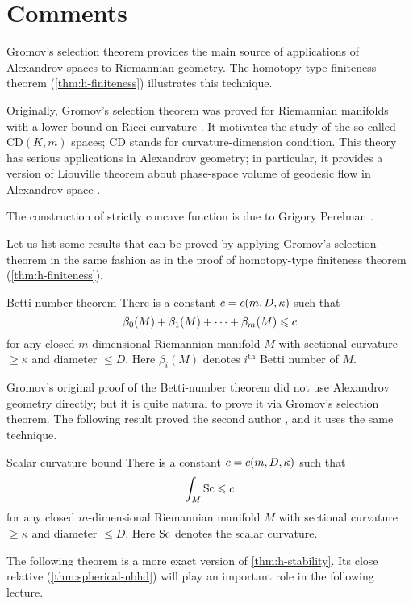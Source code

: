 \section{Comments}

Gromov's selection theorem provides the main source of applications of Alexandrov spaces to Riemannian geometry.
The homotopy-type finiteness theorem (\ref{thm:h-finiteness})  illustrates this technique.

Originally, Gromov's selection theorem was proved for Riemannian manifolds with a lower bound on Ricci curvature \cite{gromov1981}.
It motivates the study of the so-called $\mathrm{CD}(K,m)$ spaces; $\mathrm{CD}$ stands for curvature-dimension condition.
This theory has serious applications in Alexandrov geometry;
in particular, it provides a version of Liouville theorem about phase-space volume of geodesic flow in Alexandrov space \cite{brue-mondino-semola}.

The construction of strictly concave function is due to Grigory Perelman \cite{perelman1993,perelman-petrunin}.

Let us list some results that can be proved by applying Gromov's selection theorem
in the same fashion as in the proof of homotopy-type finiteness theorem (\ref{thm:h-finiteness}).

\begin{thm}{Betti-number theorem}
There is a constant $c=c(m,D,\kappa)$ such that 
\[\beta_0(M)+\beta_1(M)+\dots+\beta_m(M)\leqslant c\]
for any closed $m$-dimensional Riemannian manifold $M$ with sectional curvature $\ge \kappa$ and diameter $\le D$.
Here $\beta_i(M)$ denotes $i^\text{th}$ Betti number of $M$.
\end{thm}

Gromov's original proof \cite{gromov-1981} of the Betti-number theorem did not use Alexandrov geometry directly;
but it is quite natural to prove it via Gromov's selection theorem.
The following result proved the second author \cite{petrunin2008}, and it uses the same technique.

\begin{thm}{Scalar curvature bound}
There is a constant $c=c(m,D,\kappa)$ such that 
\[\int_M\mathrm{Sc}\leqslant c\]
for any closed $m$-dimensional Riemannian manifold $M$ with sectional curvature $\ge \kappa$ and diameter $\le D$.
Here $\mathrm{Sc}$ denotes the scalar curvature.
\end{thm}

The following theorem is a more exact version of \ref{thm:h-stability}.
Its close relative (\ref{thm:spherical-nbhd}) will play an important role in the following lecture.

